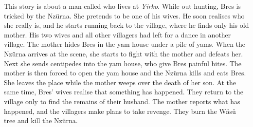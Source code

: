 This story is about a man called who lives at \textit{Yirko}. While out hunting, Bres is tricked by the Nzürna. She pretends to be one of his wives. He soon realises who she really is, and he starts running back to the village, where he finds only his old mother. His two wives and all other villagers had left for a dance in another village. The mother hides Bres in the yam house under a pile of yams. When the Nzürna arrives at the scene, she starts to fight with the mother and defeats her. Next she sends centipedes into the yam house, who give Bres painful bites. The mother is then forced to open the yam house and the Nzürna kills and eats Bres. She leaves the place while the mother weeps over the death of her son. At the same time, Bres' wives realise that something has happened. They return to the village only to find the remains of their husband. The mother reports what has happened, and the villagers make plans to take revenge. They burn the Wäsü tree and kill the Nzürna.